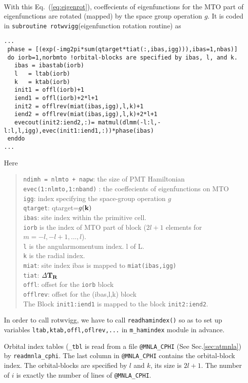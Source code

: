 \documentclass[a4paper,10pt,fleqn]{article}
\def\iDelta{{\it \Delta}}
\def\iDelta{{\it \Delta}}
\newcommand{\bfk}{{\bf k}}
\newcommand{\bfT}{{\bf T}}
\newcommand{\bfR}{{\bf R}}
\newcommand{\req}[1]{\mbox{Eq.~(\ref{#1})}}
\begin{document}
\noindent {}\\
With this \req{eq:eigenrot}, coeffecients of eigenfunctions for the MTO part of 
eigenfunctions are rotated (mapped) by the space group operation $g$.
It is coded in {\tt subroutine rotwvigg}(eigenfunction rotation routine) as
\begin{verbatim}
...
 phase = [(exp(-img2pi*sum(qtarget*tiat(:,ibas,igg))),ibas=1,nbas)]
 do iorb=1,norbmto !orbital-blocks are specified by ibas, l, and k.
   ibas = ibastab(iorb)
   l   = ltab(iorb)
   k   = ktab(iorb)
   init1 = offl(iorb)+1
   iend1 = offl(iorb)+2*l+1
   init2 = offlrev(miat(ibas,igg),l,k)+1
   iend2 = offlrev(miat(ibas,igg),l,k)+2*l+1
   evecout(init2:iend2,:)= matmul(dlmm(-l:l,-l:l,l,igg),evec(init1:iend1,:))*phase(ibas)
 enddo
...
\end{verbatim}
Here 
\begin{quote}
\verb#ndimh = nlmto + napw#: the size of PMT Hamiltonian\\
\verb#evec(1:nlmto,1:nband)# : the coeffecients of eigenfunctions on MTO\\
\verb#igg#:  index specifying the space-group operation $g$\\
\verb#qtarget#: qtarget=$g(\bfk)$\\
\verb#ibas#: site index within the primitive cell.\\
\verb#iorb# is the index of MTO part of block ($2l+1$ elements for $m=-l,-l+1,... ,l$).\\
\verb#l# is the angularmomentum index. l of L.\\
\verb#k# is the radial index.\\
\verb#miat#: site index ibas is mapped to \verb#miat(ibas,igg)#\\
\verb#tiat#: $\iDelta \bfT_\bfR$\\
\verb#offl#: offset for the \verb#iorb# block\\
\verb#offlrev#: offset for the (ibas,l,k) block\\ 
The Block \verb#init1:iend1# is mapped to the block \verb#init2:iend2#.
\end{quote}
\noindent In order to call rotwvigg, we have to call \verb#readhamindex()# so as to set up variables 
\verb#ltab,ktab,offl,oflrev,...# in \verb#m_hamindex# module in advance.

Orbital index tables ({\tt *\_tbl} is read from a file {\tt @MNLA\_CPHI} 
(See Sec.\ref{sec:atmnla}) by \verb#readmnla_cphi#.
The last column in {\tt @MNLA\_CPHI} contains the orbital-block index.
The orbital-blocks are specified by $l$ and $k$, its size is $2l+1$.
The number of $i$ is exactly the number of lines of {\tt @MNLA\_CPHI}.\\
\end{document}
